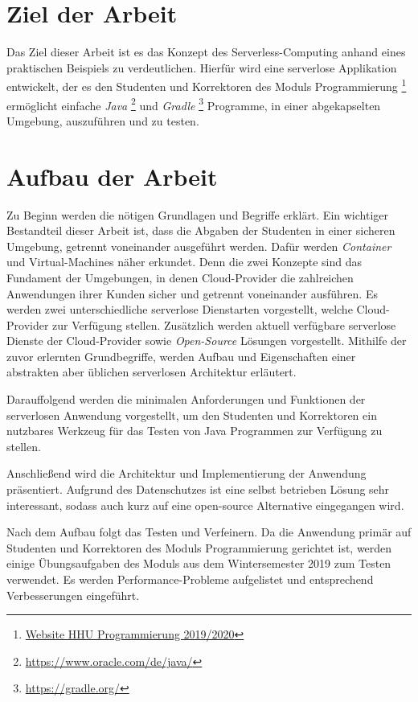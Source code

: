 \section{Ziel der Arbeit}
Das Ziel dieser Arbeit ist es das Konzept des Serverless-Computing anhand eines praktischen
Beispiels zu verdeutlichen. Hierfür wird eine serverlose Applikation entwickelt,
der es den Studenten und Korrektoren des Moduls Programmierung
\footnote{
  \href{
    https://www.cs.hhu.de/de/lehrstuehle-und-arbeitsgruppen/betriebssysteme-prof-dr-michael-schoettner/lehre-und-abschlussarbeiten/fruehere-lehrveranstaltungen/vorlesungen/ws-201920/programmierung.html?C=D\%253BO\%253DA
    }{Website HHU Programmierung 2019/2020}
} ermöglicht einfache
\textit{Java} \footnote{\url{https://www.oracle.com/de/java/}} und
\textit{Gradle} \footnote{\url{https://gradle.org/}} Programme, in einer abgekapselten Umgebung, auszuführen und zu testen.


\section{Aufbau der Arbeit}
Zu Beginn werden die nötigen Grundlagen und Begriffe erklärt.
Ein wichtiger Bestandteil dieser Arbeit ist, dass die Abgaben der Studenten in einer sicheren Umgebung, getrennt voneinander ausgeführt werden. Dafür werden \textit{Container} \cite{Docker} und Virtual-Machines näher erkundet. Denn die zwei Konzepte sind das Fundament der Umgebungen, in denen Cloud-Provider die zahlreichen Anwendungen ihrer Kunden sicher und getrennt voneinander ausführen.
Es werden zwei unterschiedliche serverlose Dienstarten vorgestellt, welche Cloud-Provider zur Verfügung stellen. Zusätzlich werden aktuell verfügbare serverlose Dienste der Cloud-Provider sowie \textit{Open-Source} Lösungen vorgestellt. Mithilfe der zuvor erlernten Grundbegriffe, werden Aufbau und Eigenschaften einer abstrakten aber üblichen serverlosen Architektur erläutert.

Darauffolgend werden die minimalen Anforderungen und Funktionen der serverlosen Anwendung vorgestellt, um den Studenten und Korrektoren ein nutzbares Werkzeug für das Testen von Java Programmen zur Verfügung zu stellen.

Anschließend wird die Architektur und Implementierung der Anwendung präsentiert. Aufgrund des Datenschutzes ist eine selbst betrieben Lösung sehr interessant, sodass auch kurz auf eine open-source Alternative eingegangen wird.

Nach dem Aufbau folgt das Testen und Verfeinern. Da die Anwendung primär auf Studenten und Korrektoren des Moduls Programmierung gerichtet ist, werden einige Übungsaufgaben des Moduls aus dem Wintersemester 2019 zum Testen verwendet. Es werden Performance-Probleme aufgelistet und entsprechend Verbesserungen eingeführt.
